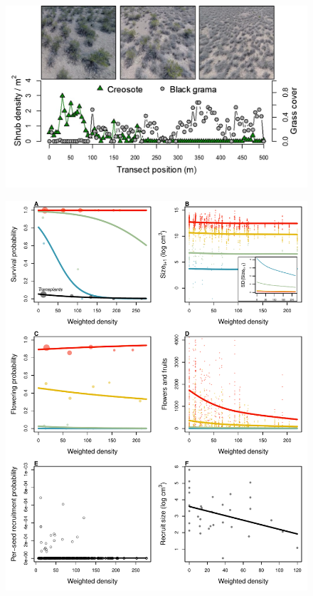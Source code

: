 \documentclass[11pt]{article}\usepackage[]{graphicx}\usepackage[usenames,dvipsnames]{xcolor}
\begin{document}
\newpage
\begin{figure}[H]
  \begin{center}
    \includegraphics[width=\linewidth]{Figures/waves_pics}
    \caption{}
  \label{fig:waves}
  \end{center}
\end{figure}

\newpage
\begin{figure}[H]
  \begin{center}
    \includegraphics[width=\linewidth]{Figures/vital_rates}
  \caption{}
  \label{fig:vital_rates}
  \end{center}
\end{figure}
\end{document}

